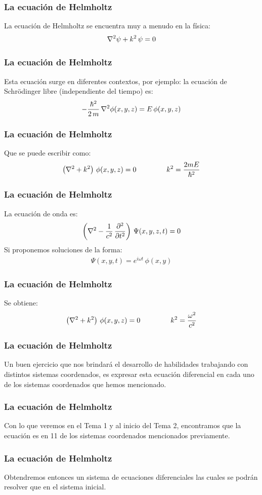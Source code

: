 \documentclass[12pt]{beamer}
\begin{document}
\begin{frame}
\frametitle{La ecuación de Helmholtz}
La ecuación de Helmholtz se encuentra muy a menudo en la física:
\pause
\begin{align*}
\laplacian{\psi} + k^{2} \, \psi = 0
\end{align*}
\end{frame}
\begin{frame}
\frametitle{La ecuación de Helmholtz}
Esta ecuación surge en diferentes contextos, \pause por ejemplo: \pause la ecuación de Schrödinger libre (independiente del tiempo) es:
\pause
\begin{align*}
- \dfrac{\hbar^{2}}{2 \, m} \, \laplacian{\phi} (x, y, z) = E \, \phi (x, y, z)
\end{align*}
\end{frame}
\begin{frame}
\frametitle{La ecuación de Helmholtz}
Que se puede escribir como:
\begin{align*}
\left( \laplacian + k^{2} \right) \, \phi (x, y, z) = 0 \hspace{1.5cm} k^{2} = \dfrac{2 m E}{\hbar^{2}}
\end{align*}
\end{frame}
\begin{frame}
\frametitle{La ecuación de Helmholtz}
La ecuación de onda es:
\begin{align*}
\left( \laplacian - \dfrac{1}{c^{2}} \, \pdv[2]{t} \right) \, \Psi (x, y, z, t) = 0
\end{align*}
\pause
Si proponemos soluciones de la forma:
\begin{align*}
\Psi (x, y, t) = e^{i \omega t} \, \phi (x, y)
\end{align*}
\end{frame}
\begin{frame}
\frametitle{La ecuación de Helmholtz}
Se obtiene:
\pause
\begin{align*}
\left( \laplacian + k^{2} \right) \, \phi (x, y, z) = 0 \hspace{1.5cm} k^{2} = \dfrac{\omega^{2}}{c^{2}}
\end{align*}
\end{frame}
\begin{frame}
\frametitle{La ecuación de Helmholtz}
Un buen ejercicio que nos brindará el desarrollo de habilidades trabajando con distintos sistemas coordenados, es expresar esta ecuación diferencial en cada uno de los sistemas coordenados que hemos mencionado.
\end{frame}
\begin{frame}
\frametitle{La ecuación de Helmholtz}
Con lo que veremos en el Tema 1 y al inicio del Tema 2, encontramos que la ecuación es  en 11 de los sistemas coordenados mencionados previamente.
\end{frame}
\begin{frame}
\frametitle{La ecuación de Helmholtz}
Obtendremos entonces un sistema de ecuaciones diferenciales las cuales se podrán resolver  que en el sistema inicial.
\end{frame}
\end{document}
